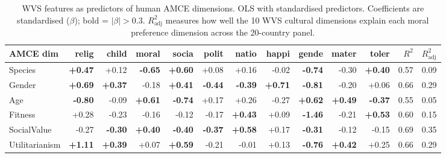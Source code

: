 \begin{table}[h]\centering\scriptsize
\caption{WVS features as predictors of human AMCE dimensions. OLS with standardised predictors. Coefficients are standardised ($\beta$); bold = $|\beta| > 0.3$. $R^2_{\text{adj}}$ measures how well the 10 WVS cultural dimensions explain each moral preference dimension across the 20-country panel.}
\label{tab:wvs_amce_regression}
\setlength{\tabcolsep}{3pt}
\begin{tabular}{lrrrrrrrrrrrr}\toprule
AMCE dim & relig & child & moral & socia & polit & natio & happi & gende & mater & toler & $R^2$ & $R^2_{\text{adj}}$ \\\midrule
Species & \textbf{+0.47} & +0.12 & \textbf{-0.65} & \textbf{+0.60} & +0.08 & +0.16 & -0.02 & \textbf{-0.74} & -0.30 & \textbf{+0.40} & 0.57 & 0.09 \\
Gender & \textbf{+0.69} & \textbf{+0.37} & -0.18 & \textbf{+0.41} & \textbf{-0.44} & \textbf{-0.39} & \textbf{+0.71} & \textbf{-0.81} & -0.20 & +0.06 & 0.66 & 0.29 \\
Age & \textbf{-0.80} & -0.09 & \textbf{+0.61} & \textbf{-0.74} & +0.17 & +0.26 & -0.27 & \textbf{+0.62} & \textbf{+0.49} & \textbf{-0.37} & 0.55 & 0.05 \\
Fitness & +0.28 & -0.23 & -0.16 & -0.12 & -0.17 & \textbf{+0.43} & +0.09 & \textbf{-1.46} & -0.21 & \textbf{+0.53} & 0.60 & 0.15 \\
SocialValue & -0.27 & \textbf{-0.30} & \textbf{+0.40} & \textbf{-0.40} & \textbf{-0.37} & \textbf{+0.58} & +0.17 & \textbf{-0.31} & -0.12 & -0.15 & 0.69 & 0.35 \\
Utilitarianism & \textbf{+1.11} & \textbf{+0.39} & +0.07 & \textbf{+0.59} & -0.21 & -0.01 & +0.13 & \textbf{-0.76} & \textbf{+0.42} & +0.25 & 0.66 & 0.29 \\
\bottomrule
\end{tabular}
\end{table}